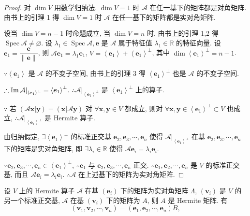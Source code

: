 \documentclass[color=black,device=normal,lang=cn,mode=geye]{elegantnote}
\begin{document}
\begin{proof}
    对 $\dim V$ 用数学归纳法. $\dim V=1$ 时 $\mathcal{A}$ 在任一基下的矩阵都是对角矩阵. 由书上的引理 1 得 $\dim V=1$ 时 $\mathcal{A}$ 在任一基下的矩阵都是实对角矩阵.

    设当 $\dim V=n-1$ 时命题成立, 当 $\dim V=n$ 时, 由书上的引理 1,2 得 $\operatorname{Spec}\mathcal{A}\neq\varnothing$. 设 $\lambda_1\in\operatorname{Spec}\mathcal{A},\boldsymbol{e}$ 是 $\mathcal{A}$ 属于特征值 $\lambda_1\in\mathbb{R}$ 的特征向量. 设 $\boldsymbol{e}_1=\dfrac{\boldsymbol{e}}{\|\boldsymbol{e}\|}$, 则 $\mathcal{A}\boldsymbol{e}_1=\lambda_1\boldsymbol{e}_1$, $V=\left<\boldsymbol{e}_1\right>+\left<\boldsymbol{e}_1\right>^\perp$, 其中 $\dim\left<\boldsymbol{e}_1\right>^\perp=n-1$.

    $\because\left<\boldsymbol{e}_1\right>$ 是 $\mathcal{A}$ 的不变子空间, 由书上的引理 3 得 $\left<\boldsymbol{e}_1\right>^\perp$ 也是 $\mathcal{A}$ 的不变子空间.
    
    $\therefore\operatorname{Im} \mathcal{A}|_{\left<\boldsymbol{e}_1\right>^\perp}=\left<\boldsymbol{e}_1\right>^\perp$. $\therefore\mathcal{A}|_{\left<\boldsymbol{e}_1\right>^\perp}$ 是 $\left<\boldsymbol{e}_1\right>^\perp$ 上的算子.

    $\because$ 若 $(\mathcal{A}\boldsymbol{x}|\boldsymbol{y})=(\boldsymbol{x}|\mathcal{A}\boldsymbol{y})$ 对 $\forall\boldsymbol{x},\boldsymbol{y}\in V$ 都成立, 则对 $\forall\boldsymbol{x},\boldsymbol{y}\in\left<\boldsymbol{e}_1\right>^\perp\subset V$ 也成立, $\therefore\mathcal{A}|_{\left<\boldsymbol{e}_1\right>^\perp}$ 是 Hermite 算子.

    由归纳假定, $\exists\left<\boldsymbol{e}_1\right>^\perp$ 的标准正交基 $\boldsymbol{e}_2,\boldsymbol{e}_3,\cdots,\boldsymbol{e}_n$ 使得 $\mathcal{A}|_{\left<\boldsymbol{e}_1\right>^\perp}$ 在基 $\boldsymbol{e}_2,\boldsymbol{e}_3,\cdots,\boldsymbol{e}_n$ 下的矩阵是实对角矩阵, 即 $\exists\lambda_i\in\mathbb{R}$ 使得 $\mathcal{A}\boldsymbol{e}_i=\lambda_i\boldsymbol{e}_i$.

    $\because\boldsymbol{e}_2,\boldsymbol{e}_3,\cdots,\boldsymbol{e}_n\in\left<\boldsymbol{e}_1\right>^\perp$, $\therefore\boldsymbol{e}_1$ 与 $\boldsymbol{e}_2,\boldsymbol{e}_3,\cdots,\boldsymbol{e}_n$ 正交. $\therefore\boldsymbol{e}_1,\boldsymbol{e}_2,\cdots,\boldsymbol{e}_n$ 是 $V$ 的标准正交基, 而且 $\mathcal{A}\boldsymbol{e}_i=\lambda_i\boldsymbol{e}_i$. $\therefore\mathcal{A}$ 在上述基下的矩阵为实对角矩阵.
\end{proof}
设 $V$ 上的 Hermite 算子 $\mathcal{A}$ 在基 $(\boldsymbol{e}_i)$ 下的矩阵为实对角矩阵 $\Lambda$, $(\boldsymbol{v}_i)$ 是 $V$ 的另一个标准正交基, $\mathcal{A}$ 在基 $(\boldsymbol{v}_i)$ 下的矩阵为 $A$, 则 $A$ 是 Hermite 矩阵. 有
\[(\boldsymbol{v}_1,\boldsymbol{v}_2,\cdots,\boldsymbol{v}_n)=(\boldsymbol{e}_1,\boldsymbol{e}_2,\cdots,\boldsymbol{e}_n)B,\]
\end{document}
